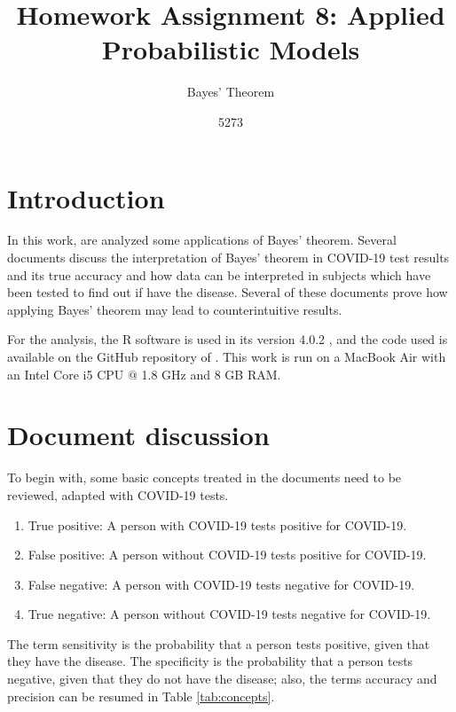 \documentclass[10pt,leter,openany]{article}
\author{5273}
\title{Homework Assignment 8: Applied Probabilistic Models}
\subtitle{Bayes' Theorem}
\date{}
\begin{document}
	
\maketitle

\section{Introduction}

		In this work, are analyzed some applications of Bayes' theorem. Several documents discuss the interpretation of Bayes' theorem in  COVID-19 test results and its true accuracy and how data can be interpreted in subjects which have been tested to find out if have the disease. Several of these documents prove how applying Bayes' theorem may lead to counterintuitive results.
	
	
	For the analysis, the R software is used in its version 4.0.2 \citep{r}, and the code used is available on the GitHub repository of  \citep{github}. This work is run on a MacBook Air with an Intel Core i5 CPU $ @ $ 1.8 GHz and 8 GB RAM.
	
	
\section{Document discussion}

	To begin with, some basic concepts treated in the documents need to be reviewed, adapted with COVID-19  tests.
	
	\begin{enumerate}
		\item True positive: A person with COVID-19 tests positive for COVID-19.
		\item False positive: A person without COVID-19 tests positive for COVID-19.
		\item False negative: A person with COVID-19 tests negative for COVID-19.
		\item True negative: A person without COVID-19 tests negative for COVID-19.
	\end{enumerate}

	The term sensitivity is the probability that a person tests positive, given that they have the disease. The specificity is the probability that a person tests negative, given that they do not have the disease; also, the terms accuracy and precision can be resumed in Table \ref{tab:concepts}.
\end{document}
